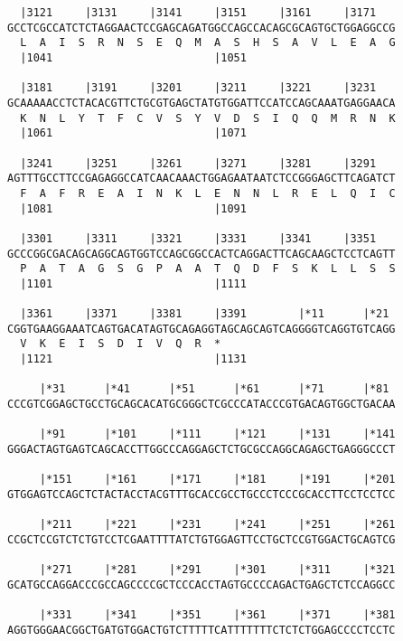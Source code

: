 \documentclass{article}
\begin{document}
\begin{Verbatim}
  |3121     |3131     |3141     |3151     |3161     |3171   
GCCTCGCCATCTCTAGGAACTCCGAGCAGATGGCCAGCCACAGCGCAGTGCTGGAGGCCG
  L  A  I  S  R  N  S  E  Q  M  A  S  H  S  A  V  L  E  A  G
  |1041                         |1051                       
  
  |3181     |3191     |3201     |3211     |3221     |3231   
GCAAAAACCTCTACACGTTCTGCGTGAGCTATGTGGATTCCATCCAGCAAATGAGGAACA
  K  N  L  Y  T  F  C  V  S  Y  V  D  S  I  Q  Q  M  R  N  K
  |1061                         |1071                       
  
  |3241     |3251     |3261     |3271     |3281     |3291   
AGTTTGCCTTCCGAGAGGCCATCAACAAACTGGAGAATAATCTCCGGGAGCTTCAGATCT
  F  A  F  R  E  A  I  N  K  L  E  N  N  L  R  E  L  Q  I  C
  |1081                         |1091                       
  
  |3301     |3311     |3321     |3331     |3341     |3351   
GCCCGGCGACAGCAGGCAGTGGTCCAGCGGCCACTCAGGACTTCAGCAAGCTCCTCAGTT
  P  A  T  A  G  S  G  P  A  A  T  Q  D  F  S  K  L  L  S  S
  |1101                         |1111                       
  
  |3361     |3371     |3381     |3391        |*11      |*21 
CGGTGAAGGAAATCAGTGACATAGTGCAGAGGTAGCAGCAGTCAGGGGTCAGGTGTCAGG
  V  K  E  I  S  D  I  V  Q  R  *   
  |1121                         |1131                       
  
     |*31      |*41      |*51      |*61      |*71      |*81 
CCCGTCGGAGCTGCCTGCAGCACATGCGGGCTCGCCCATACCCGTGACAGTGGCTGACAA
                                                            
     |*91      |*101     |*111     |*121     |*131     |*141
GGGACTAGTGAGTCAGCACCTTGGCCCAGGAGCTCTGCGCCAGGCAGAGCTGAGGGCCCT
                                                            
     |*151     |*161     |*171     |*181     |*191     |*201
GTGGAGTCCAGCTCTACTACCTACGTTTGCACCGCCTGCCCTCCCGCACCTTCCTCCTCC
                                                            
     |*211     |*221     |*231     |*241     |*251     |*261
CCGCTCCGTCTCTGTCCTCGAATTTTATCTGTGGAGTTCCTGCTCCGTGGACTGCAGTCG
                                                            
     |*271     |*281     |*291     |*301     |*311     |*321
GCATGCCAGGACCCGCCAGCCCCGCTCCCACCTAGTGCCCCAGACTGAGCTCTCCAGGCC
                                                            
     |*331     |*341     |*351     |*361     |*371     |*381
AGGTGGGAACGGCTGATGTGGACTGTCTTTTTCATTTTTTTCTCTCTGGAGCCCCTCCTC
                                                            

\end{Verbatim}
\end{document}
